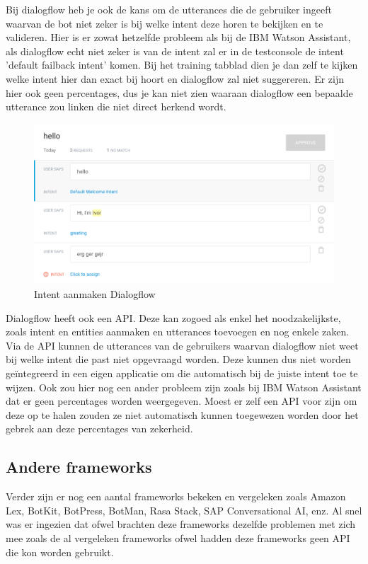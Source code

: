 Bij dialogflow heb je ook de kans om de utterances die de gebruiker ingeeft waarvan de bot niet zeker is bij welke intent deze horen te bekijken en te valideren. Hier is er zowat hetzelfde probleem als bij de IBM Watson Assistant, als dialogflow echt niet zeker is van de intent zal er in de testconsole de intent 'default failback intent' komen. Bij het training tabblad dien je dan zelf te kijken welke intent hier dan exact bij hoort en dialogflow zal niet suggereren. Er zijn hier ook geen percentages, dus je kan niet zien waaraan dialogflow een bepaalde utterance zou linken die niet direct herkend wordt.

\begin{figure}[h!]
	\centering
	\includegraphics[height=6cm]{img/dia_training.png}
	\caption{Intent aanmaken Dialogflow}
	\label{fig:trainingdialogflow}
\end{figure}

Dialogflow heeft ook een API. Deze kan zogoed als enkel het noodzakelijkste, zoals intent en entities aanmaken en utterances toevoegen en nog enkele zaken. Via de API kunnen de utterances van de gebruikers waarvan dialogflow niet weet bij welke intent die past niet opgevraagd worden. Deze kunnen dus niet worden geïntegreerd in een eigen applicatie om die automatisch bij de juiste intent toe te wijzen. Ook zou hier nog een ander probleem zijn zoals bij IBM Watson Assistant dat er geen percentages worden weergegeven. Moest er zelf een API voor zijn om deze op te halen zouden ze niet automatisch kunnen toegewezen worden door het gebrek aan deze percentages van zekerheid.

\subsection{Andere frameworks}
\label{andereFrameworks}

Verder zijn er nog een aantal frameworks bekeken en vergeleken zoals Amazon Lex, BotKit, BotPress, BotMan, Rasa Stack, SAP Conversational AI, enz. Al snel was er ingezien dat ofwel brachten deze frameworks dezelfde problemen met zich mee zoals de al vergeleken frameworks ofwel hadden deze frameworks geen API die kon worden gebruikt. 

